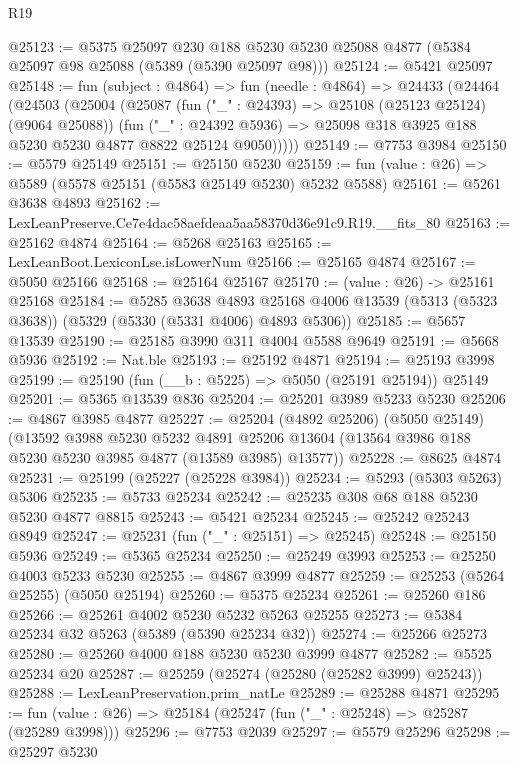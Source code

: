 \begin{lexlean}{R19}
\begin{coremodule}
@25123 := @5375
    @25097
    @230
    @188
    @5230
    @5230
    @25088
    @4877
    (@5384 @25097 @98 @25088 (@5389 (@5390 @25097 @98)))
@25124 := @5421 @25097
@25148 := fun (subject : @4864) =>
  fun (needle : @4864) =>
  @24433
    (@24464
      (@24503
        (@25004
          (@25087
            (fun ("_" : @24393) => @25108 (@25123 @25124) (@9064 @25088))
            (fun ("_" : @24392 @5936) =>
            @25098 @318 @3925 @188 @5230 @5230 @4877 @8822 @25124 @9050)))))
@25149 := @7753 @3984
@25150 := @5579 @25149
@25151 := @25150 @5230
@25159 := fun (value : @26) => @5589 (@5578 @25151 (@5583 @25149 @5230) @5232 @5588)
@25161 := @5261 @3638 @4893
@25162 := LexLeanPreserve.Ce7e4dac58aefdeaa5aa58370d36e91c9.R19.__fits_80
@25163 := @25162 @4874
@25164 := @5268 @25163
@25165 := LexLeanBoot.LexiconLse.isLowerNum
@25166 := @25165 @4874
@25167 := @5050 @25166
@25168 := @25164 @25167
@25170 := (value : @26) -> @25161 @25168
@25184 := @5285
    @3638
    @4893
    @25168
    @4006
    @13539
    (@5313 (@5323 @3638))
    (@5329 (@5330 (@5331 @4006) @4893 @5306))
@25185 := @5657 @13539
@25190 := @25185 @3990 @311 @4004 @5588 @9649
@25191 := @5668 @5936
@25192 := Nat.ble
@25193 := @25192 @4871
@25194 := @25193 @3998
@25199 := @25190 (fun (__b : @5225) => @5050 (@25191 @25194)) @25149
@25201 := @5365 @13539 @836
@25204 := @25201 @3989 @5233 @5230
@25206 := @4867 @3985 @4877
@25227 := @25204
    (@4892 @25206)
    (@5050 @25149)
    (@13592
      @3988
      @5230
      @5232
      @4891
      @25206
      @13604
      (@13564 @3986 @188 @5230 @5230 @3985 @4877 (@13589 @3985) @13577))
@25228 := @8625 @4874
@25231 := @25199 (@25227 (@25228 @3984))
@25234 := @5293 (@5303 @5263) @5306
@25235 := @5733 @25234
@25242 := @25235 @308 @68 @188 @5230 @5230 @4877 @8815
@25243 := @5421 @25234
@25245 := @25242 @25243 @8949
@25247 := @25231 (fun ("_" : @25151) => @25245)
@25248 := @25150 @5936
@25249 := @5365 @25234
@25250 := @25249 @3993
@25253 := @25250 @4003 @5233 @5230
@25255 := @4867 @3999 @4877
@25259 := @25253 (@5264 @25255) (@5050 @25194)
@25260 := @5375 @25234
@25261 := @25260 @186
@25266 := @25261 @4002 @5230 @5232 @5263 @25255
@25273 := @5384 @25234 @32 @5263 (@5389 (@5390 @25234 @32))
@25274 := @25266 @25273
@25280 := @25260 @4000 @188 @5230 @5230 @3999 @4877
@25282 := @5525 @25234 @20
@25287 := @25259 (@25274 (@25280 (@25282 @3999) @25243))
@25288 := LexLeanPreservation.prim_natLe
@25289 := @25288 @4871
@25295 := fun (value : @26) => @25184 (@25247 (fun ("_" : @25248) => @25287 (@25289 @3998)))
@25296 := @7753 @2039
@25297 := @5579 @25296
@25298 := @25297 @5230

\end{coremodule}
\end{lexlean}
